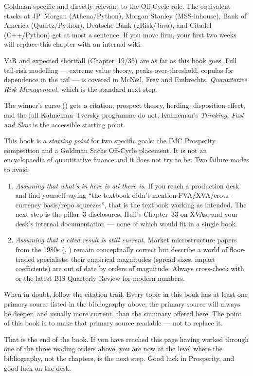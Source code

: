 \begin{description}
    Goldman-specific and directly relevant to the Off-Cycle role.
    The equivalent stacks at JP~Morgan (Athena/Python), Morgan
    Stanley (MSS-inhouse), Bank of America (Quartz/Python), Deutsche
    Bank (gRisk/Java), and Citadel (C++/Python) get at most a
    sentence. If you move firm, your first two weeks will replace
    this chapter with an internal wiki.
  \item[Tail-risk and catastrophe modelling at insurance depth.]
    VaR and expected shortfall (Chapter~19/35) are as far as this
    book goes. Full tail-risk modelling --- extreme value theory,
    peaks-over-threshold, copulas for dependence in the tail --- is
    covered in McNeil, Frey and Embrechts, \emph{Quantitative Risk
    Management}, which is the standard next step.
  \item[Behavioural finance beyond a single Thaler reference.] The
    winner's curse (\citealp{thaler1988anomalies}) gets a citation;
    prospect theory, herding, disposition effect, and the full
    Kahneman--Tversky programme do not. Kahneman's \emph{Thinking,
    Fast and Slow} is the accessible starting point.
\end{description}

\begin{pitfallbox}
This book is a \emph{starting point} for two specific goals: the IMC
Prosperity competition and a Goldman Sachs Off-Cycle placement. It is
not an encyclopaedia of quantitative finance and it does not try to
be. Two failure modes to avoid:
\begin{enumerate}
  \item \emph{Assuming that what's in here is all there is.} If you
    reach a production desk and find yourself saying ``the textbook
    didn't mention FVA/XVA/cross-currency basis/repo squeezes'', that
    is the textbook working as intended. The next step is the
    pillar~3 disclosures, Hull's Chapter~33 on XVAs, and your desk's
    internal documentation --- none of which would fit in a single
    book.
  \item \emph{Assuming that a cited result is still current.} Market
    microstructure papers from the 1980s (\citealp{kyle1985continuous},
    \citealp{glosten1985bid}) remain conceptually correct but
    describe a world of floor-traded specialists; their empirical
    magnitudes (spread sizes, impact coefficients) are out of date
    by orders of magnitude. Always cross-check with
    \citet{bouchaud2018trades} or the latest BIS Quarterly Review
    for modern numbers.
\end{enumerate}
When in doubt, follow the citation trail. Every topic in this book
has at least one primary source listed in the bibliography above; the
primary source will always be deeper, and usually more current, than
the summary offered here. The point of this book is to make that
primary source readable --- not to replace it.
\end{pitfallbox}

That is the end of the book. If you have reached this page having
worked through one of the three reading orders above, you are now at
the level where the bibliography, not the chapters, is the next step.
Good luck in Prosperity, and good luck on the desk.
